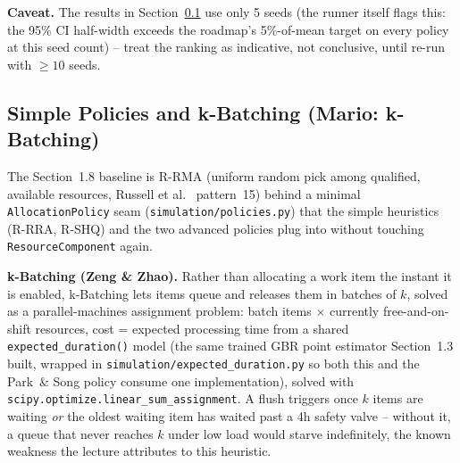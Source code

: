 \documentclass[
  english,        %
  font=times,     %
  twocolumn,      %
]{tumarticle}
\begin{document}
\textbf{Caveat.} The results in
Section~\ref{sec:kbatching} use only 5 seeds (the runner itself flags
this: the 95\% CI half-width exceeds the roadmap's 5\%-of-mean target on
every policy at this seed count) -- treat the ranking as indicative, not
conclusive, until re-run with $\geq 10$ seeds.

\subsection{Simple Policies and k-Batching (Mario: k-Batching)}
\label{sec:kbatching}
The Section~1.8 baseline is R-RMA (uniform random pick among qualified,
available resources, Russell et al.~\cite{russell2005workflow} pattern~15)
behind a minimal \texttt{AllocationPolicy} seam
(\texttt{simulation/policies.py}) that the simple heuristics (R-RRA, R-SHQ)
and the two advanced policies plug into without touching
\texttt{ResourceComponent} again.

\textbf{k-Batching (Zeng \& Zhao).} Rather than allocating a work item the
instant it is enabled, k-Batching lets items queue and releases them in
batches of $k$, solved as a parallel-machines assignment problem: batch
items $\times$ currently free-and-on-shift resources, cost = expected
processing time from a shared \texttt{expected\_duration()} model (the
same trained GBR point estimator Section~1.3 built, wrapped in
\texttt{simulation/expected\_duration.py} so both this and the Park~\&
Song policy consume one implementation), solved with
\texttt{scipy.optimize.linear\_sum\_assignment}. A flush triggers once $k$
items are waiting \emph{or} the oldest waiting item has waited past a 4h
safety valve -- without it, a queue that never reaches $k$ under low load
would starve indefinitely, the known weakness the lecture attributes to
this heuristic.
\end{document}

